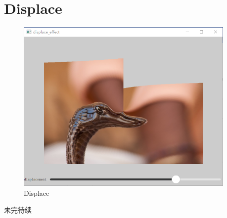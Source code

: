 ﻿




\FloatBarrier
\section{
Displace
}\label{c000015s000013}


\begin{figure}[htb] %
\marginnote{\setlength\fboxsep{2pt}\fbox{\footnotesize{\kaishu\figurename\,}\footnotesize{\ref{p000029}}}}\centering %
\includegraphics[width=0.95\textwidth]{../chapter06/displace_effect/the_app.png} %
\caption{Displace} %
\label{p000029} %
\end{figure}


未完待续










